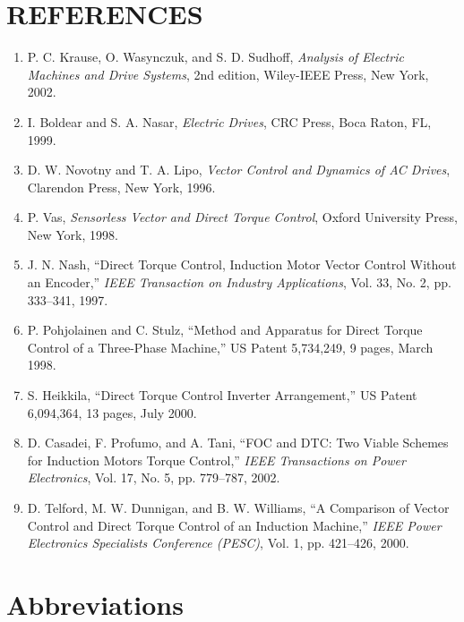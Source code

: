 \documentclass[letterpaper,12pt]{article}
\begin{document}
\section*{REFERENCES}
\begin{enumerate}
    \item P. C. Krause, O. Wasynczuk, and S. D. Sudhoff, \textit{Analysis of Electric Machines and Drive Systems}, 2nd edition, Wiley-IEEE Press, New York, 2002.
    \item I. Boldear and S. A. Nasar, \textit{Electric Drives}, CRC Press, Boca Raton, FL, 1999.
    \item D. W. Novotny and T. A. Lipo, \textit{Vector Control and Dynamics of AC Drives}, Clarendon Press, New York, 1996.
    \item P. Vas, \textit{Sensorless Vector and Direct Torque Control}, Oxford University Press, New York, 1998.
    \item J. N. Nash, ``Direct Torque Control, Induction Motor Vector Control Without an Encoder,'' \textit{IEEE Transaction on Industry Applications}, Vol. 33, No. 2, pp. 333--341, 1997.
    \item P. Pohjolainen and C. Stulz, ``Method and Apparatus for Direct Torque Control of a Three-Phase Machine,'' US Patent 5,734,249, 9 pages, March 1998.
    \item S. Heikkila, ``Direct Torque Control Inverter Arrangement,'' US Patent 6,094,364, 13 pages, July 2000.
    \item D. Casadei, F. Profumo, and A. Tani, ``FOC and DTC: Two Viable Schemes for Induction Motors Torque Control,'' \textit{IEEE Transactions on Power Electronics}, Vol. 17, No. 5, pp. 779--787, 2002.
    \item D. Telford, M. W. Dunnigan, and B. W. Williams, ``A Comparison of Vector Control and Direct Torque Control of an Induction Machine,'' \textit{IEEE Power Electronics Specialists Conference (PESC)}, Vol. 1, pp. 421--426, 2000.
\end{enumerate}

\clearpage
\section*{Abbreviations}
\end{document}
